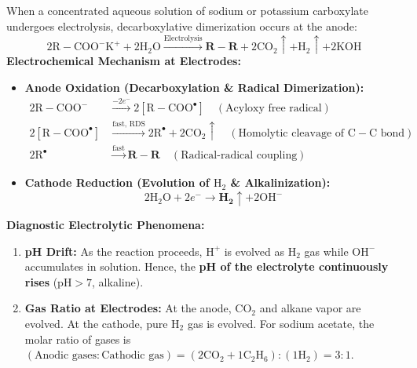 \documentclass[10pt,a4paper]{article}
\begin{document}
\begin{formulabox}
When a concentrated aqueous solution of sodium or potassium carboxylate undergoes electrolysis, decarboxylative dimerization occurs at the anode:
\begin{equation}
  2\mathrm{R-COO^-K^+} + 2\mathrm{H_2O} \xrightarrow{\text{Electrolysis}} \mathbf{R-R} + 2\mathrm{CO_2}\uparrow + \mathrm{H_2}\uparrow + 2\mathrm{KOH}
\end{equation}
\textbf{Electrochemical Mechanism at Electrodes:}
\begin{itemize}
  \item \textbf{Anode Oxidation (Decarboxylation \& Radical Dimerization):}
  \begin{align}
    2\mathrm{R-COO^-} &\xrightarrow{-2e^-} 2[\mathrm{R-COO^\bullet}] \quad (\text{Acyloxy free radical})\\
    2[\mathrm{R-COO^\bullet}] &\xrightarrow{\text{fast, RDS}} 2\mathrm{R^\bullet} + 2\mathrm{CO_2}\uparrow \quad (\text{Homolytic cleavage of } \mathrm{C-C} \text{ bond})\\
    2\mathrm{R^\bullet} &\xrightarrow{\text{fast}} \mathbf{R-R} \quad (\text{Radical-radical coupling})
  \end{align}
  \item \textbf{Cathode Reduction (Evolution of $\mathrm{H_2}$ \& Alkalinization):}
  \begin{equation}
    2\mathrm{H_2O} + 2e^- \to \mathbf{H_2}\uparrow + 2\mathrm{OH^-}
  \end{equation}
\end{itemize}
\textbf{Diagnostic Electrolytic Phenomena:}
\begin{enumerate}[leftmargin=*]
  \item \textbf{pH Drift:} As the reaction proceeds, $\mathrm{H^+}$ is evolved as $\mathrm{H_2}$ gas while $\mathrm{OH^-}$ accumulates in solution. Hence, the \textbf{pH of the electrolyte continuously rises} ($\mathrm{pH} > 7$, alkaline).
  \item \textbf{Gas Ratio at Electrodes:} At the anode, $\mathrm{CO_2}$ and alkane vapor are evolved. At the cathode, pure $\mathrm{H_2}$ gas is evolved. For sodium acetate, the molar ratio of gases is $(\text{Anodic gases} : \text{Cathodic gas}) = (2\mathrm{CO_2} + 1\mathrm{C_2H_6}) : (1\mathrm{H_2}) = 3 : 1$.
\end{enumerate}
\end{formulabox}
\end{document}
